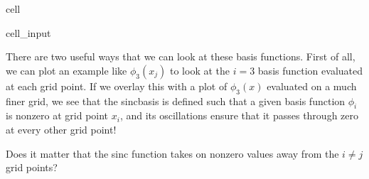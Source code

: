 \documentclass[letterpaper,10pt,english]{jupyterBook}
\begin{document}
\begin{sphinxuseclass}{cell}\begin{sphinxVerbatimInput}

\begin{sphinxuseclass}{cell_input}
\begin{sphinxVerbatim}[commandchars=\\\{\}]
  
  
  

  
  
  

 
       
\end{sphinxVerbatim}

\end{sphinxuseclass}\end{sphinxVerbatimInput}

\end{sphinxuseclass}
\sphinxAtStartPar
There are two useful ways that we can look at these basis functions. First of all, we can plot an example like \(\phi_3(x_j)\) to look at the \(i=3\) basis function evaluated at each grid point. If we overlay this with a plot of \(\phi_3(x)\) evaluated on a much finer grid, we see that the sinc\sphinxhyphen{}basis is defined such that a given basis function \(\phi_i\) is nonzero at grid point \(x_i\), and its oscillations ensure that it passes through zero at every other grid point!

\sphinxAtStartPar
{} Does it matter that the sinc function takes on nonzero values away from the \(i\neq j\) grid points?
\end{document}

